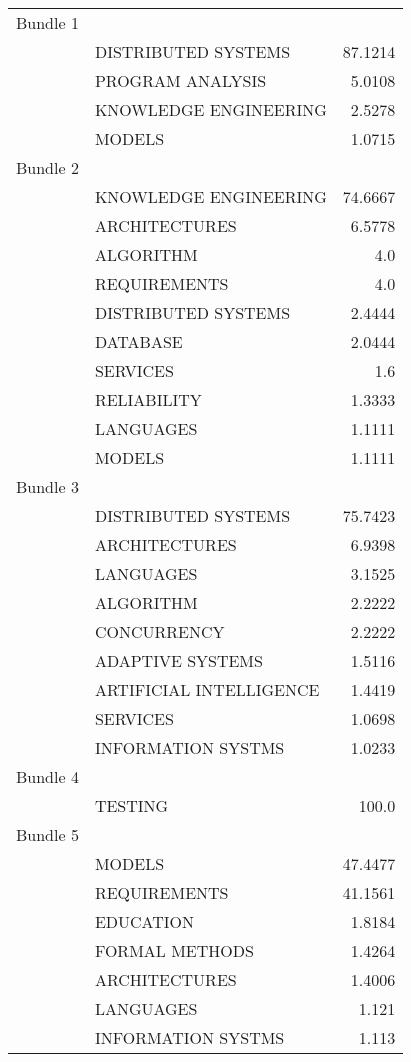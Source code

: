 \begin{center}
\begin{longtable}{|llr|}
    \hline
    Bundle 1 & ~ & ~ \\
 ~ & DISTRIBUTED SYSTEMS & 87.1214 \\
 ~ & PROGRAM ANALYSIS & 5.0108 \\
 ~ & KNOWLEDGE ENGINEERING & 2.5278 \\
 ~ & MODELS & 1.0715 \\
Bundle 2 & ~ & ~ \\
 ~ & KNOWLEDGE ENGINEERING & 74.6667 \\
 ~ & ARCHITECTURES & 6.5778 \\
 ~ & ALGORITHM & 4.0 \\
 ~ & REQUIREMENTS & 4.0 \\
 ~ & DISTRIBUTED SYSTEMS & 2.4444 \\
 ~ & DATABASE & 2.0444 \\
 ~ & SERVICES & 1.6 \\
 ~ & RELIABILITY & 1.3333 \\
 ~ & LANGUAGES & 1.1111 \\
 ~ & MODELS & 1.1111 \\
Bundle 3 & ~ & ~ \\
 ~ & DISTRIBUTED SYSTEMS & 75.7423 \\
 ~ & ARCHITECTURES & 6.9398 \\
 ~ & LANGUAGES & 3.1525 \\
 ~ & ALGORITHM & 2.2222 \\
 ~ & CONCURRENCY & 2.2222 \\
 ~ & ADAPTIVE SYSTEMS & 1.5116 \\
 ~ & ARTIFICIAL INTELLIGENCE & 1.4419 \\
 ~ & SERVICES & 1.0698 \\
 ~ & INFORMATION SYSTMS & 1.0233 \\
Bundle 4 & ~ & ~ \\
 ~ & TESTING & 100.0 \\
Bundle 5 & ~ & ~ \\
 ~ & MODELS & 47.4477 \\
 ~ & REQUIREMENTS & 41.1561 \\
 ~ & EDUCATION & 1.8184 \\
 ~ & FORMAL METHODS & 1.4264 \\
 ~ & ARCHITECTURES & 1.4006 \\
 ~ & LANGUAGES & 1.121 \\
 ~ & INFORMATION SYSTMS & 1.113 \\

\end{longtable}
\end{center}
